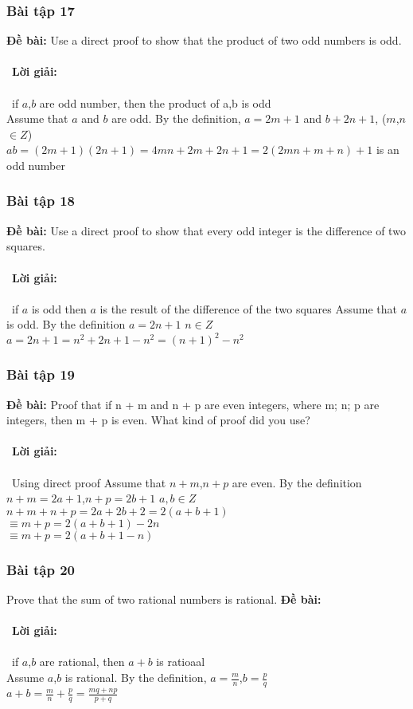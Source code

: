 \documentclass[a4paper]{article}
\begin{document}
\subsubsection{Bài tập 17}
\textbf{Đề bài:} Use a direct proof to show that the product of two odd numbers is odd.
\\\ \\\
\textbf{Lời giải:} \\\ \\\
if $a$,$b$ are odd number, then the product of a,b is odd\\
Assume that $a$ and $b$ are odd. By the definition, $a=2m+1$ and $b+2n+1$, ($m$,$n$ $\in Z$)\\
$ab=(2m+1)(2n+1)=4mn+2m+2n+1=2(2mn+m+n)+1$ is an odd number\\
\clearpage
\subsubsection{Bài tập 18} 
\textbf{Đề bài:} Use a direct proof to show that every odd integer is the difference of two squares.
\\\ \\\
\textbf{Lời giải:} \\\ \\\
if $a$ is odd then $a$ is the result of the difference of the two squares
Assume that $a$ is odd. By the definition $a=2n+1$ $n \in Z$	
$a=2n+1=n^{2}+2n+1-n^{2}=(n+1)^{2}-n^{2}$\\
\clearpage
\subsubsection{Bài tập 19}
\textbf{Đề bài:} Proof that if n + m and n + p are even integers, where m; n; p are integers, then m + p is even. What
kind of proof did you use?
\\\ \\\
\textbf{Lời giải:} \\\ \\\
Using direct proof
Assume that $n+m$,$n+p$ are even. By the definition $n+m=2a+1$,$n+p=2b+1$ $a,b \in Z$
$n+m+n+p=2a+2b+2=2(a+b+1)$\\
$\equiv m+p=2(a+b+1)-2n$\\
$\equiv m+p=2(a+b+1-n)$\\		
\clearpage
\subsubsection{Bài tập 20} Prove that the sum of two rational numbers is rational.
\textbf{Đề bài:} 
\\\ \\\
\textbf{Lời giải:} \\\ \\\
if $a$,$b$ are rational, then $a+b$ is ratioaal\\
Assume $a$,$b$ is rational. By the definition, $a=\frac{m}{n}$,$b=\frac{p}{q}$\\
$a+b=\frac{m}{n}+\frac{p}{q}=\frac{mq+np}{p+q}$\\
\clearpage
\end{document}
